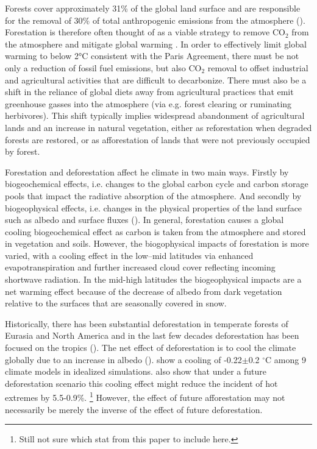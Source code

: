 \documentclass[]{article}
\begin{document}
Forests cover approximately 31\% of the global land surface \parencite{fao_global_2020} and are responsible for the removal of 30\% of total anthropogenic emissions from the atmosphere (\cite{friedlingstein_global_2022}).
Forestation is therefore often thought of as a viable strategy to remove CO$_2$ from the atmosphere and mitigate global warming \parencite{smith_long-term_2022}.
In order to effectively limit global warming to below 2°C consistent with the Paris Agreement, there must be not only a reduction of fossil fuel emissions, but also CO$_2$ removal to offset industrial and agricultural activities that are difficult to decarbonize.
There must also be a shift in the reliance of global diets away from agricultural practices that emit greenhouse gasses into the atmosphere (via e.g. forest clearing or ruminating herbivores).
This shift typically implies widespread abandonment of agricultural lands and an increase in natural vegetation, either as reforestation when degraded forests are restored, or as afforestation of lands that were not previously occupied by forest.

Forestation and deforestation affect he climate in two main ways.
Firstly by biogeochemical effects, i.e. changes to the global carbon cycle and carbon storage pools that impact the radiative absorption of the atmosphere.
And secondly by biogeophysical effects, i.e. changes in the physical properties of the land surface such as albedo and surface fluxes (\cite{bala_combined_2007}).
In general, forestation causes a global cooling biogeochemical effect as carbon is taken from the atmosphere and stored in vegetation and soils.
However, the biogophysical impacts of forestation is more varied, with a cooling effect in the low–mid latitudes via enhanced evapotranspiration and further increased cloud cover reflecting incoming shortwave radiation.
In the mid-high latitudes the biogeophysical impacts are a net warming effect because of the decrease of albedo from dark vegetation relative to the surfaces that are seasonally covered in snow.

Historically, there has been substantial deforestation in temperate forests of Eurasia and North America and in the last few decades deforestation has been focused on the tropics (\cite{goldewijk_estimating_2001}).
The net effect of deforestation is to cool the climate globally due to an increase in albedo  (\cite{davin_climatic_2010}).
\cite{boysen_global_2020} show a cooling of -0.22$\pm$0.2 $^{\circ}$C among 9 climate models in idealized simulations.
\cite{hong_impacts_2022} also show that under a future deforestation scenario this cooling effect might reduce the incident of hot extremes by 5.5-0.9\%. \footnote{Still not sure which stat from this paper to include here.}
However, the effect of future afforestation may not necessarily be merely the inverse of the effect of future deforestation.
\end{document}
